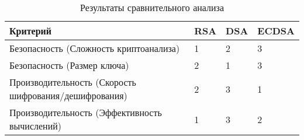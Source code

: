 \begin{table}[H]
	\begin{center}
		\begin{threeparttable}
			\captionsetup{justification=raggedright,singlelinecheck=off}
			\caption{\label{tbl:results} Результаты сравнительного анализа}
			\begin{tabular}{|p{5cm}|p{2cm}|p{2cm}|p{2cm}|}
				\hline
				Критерий & RSA & DSA & ECDSA \\ \hline
				Безопасность (Сложность криптоанализа) & 1 & 2 & 3 \\ \hline 
				Безопасность (Размер ключа) & 2 & 1 & 3 \\ \hline
				Производительность (Скорость шифрования/дешифрования) & 2 & 3 & 1 \\ \hline
				Производительность (Эффективность вычислений) & 1 & 3 & 2 \\ \hline 
			\end{tabular}
		\end{threeparttable}
	\end{center}
\end{table}
